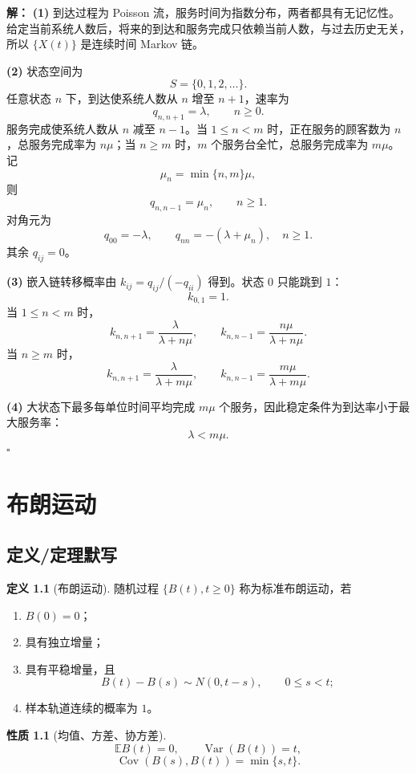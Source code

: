 \documentclass[12pt,a4paper,openany]{ctexrep}
\theoremstyle{definition}
\newtheorem{definition}{定义}[section]
\newtheorem{property}{性质}[section]
\newenvironment{solution}{\par\noindent\textbf{解：}}{\hfill$\square$\par}
\newcommand{\E}{\mathbb{E}}
\newcommand{\Var}{\operatorname{Var}}
\newcommand{\Cov}{\operatorname{Cov}}
\begin{document}
\begin{solution}
\textbf{(1)} 到达过程为 Poisson 流，服务时间为指数分布，两者都具有无记忆性。给定当前系统人数后，将来的到达和服务完成只依赖当前人数，与过去历史无关，所以 $\{X(t)\}$ 是连续时间 Markov 链。

\textbf{(2)} 状态空间为
\[
S=\{0,1,2,\dots\}.
\]
任意状态 $n$ 下，到达使系统人数从 $n$ 增至 $n+1$，速率为
\[
q_{n,n+1}=\lambda,\qquad n\ge0.
\]
服务完成使系统人数从 $n$ 减至 $n-1$。当 $1\le n<m$ 时，正在服务的顾客数为 $n$，总服务完成率为 $n\mu$；当 $n\ge m$ 时，$m$ 个服务台全忙，总服务完成率为 $m\mu$。记
\[
\mu_n=\min\{n,m\}\mu,
\]
则
\[
q_{n,n-1}=\mu_n,\qquad n\ge1.
\]
对角元为
\[
q_{00}=-\lambda,\qquad
q_{nn}=-(\lambda+\mu_n),\quad n\ge1.
\]
其余 $q_{ij}=0$。

\textbf{(3)} 嵌入链转移概率由 $k_{ij}=q_{ij}/(-q_{ii})$ 得到。状态 $0$ 只能跳到 $1$：
\[
k_{0,1}=1.
\]
当 $1\le n<m$ 时，
\[
k_{n,n+1}=\frac{\lambda}{\lambda+n\mu},\qquad
k_{n,n-1}=\frac{n\mu}{\lambda+n\mu}.
\]
当 $n\ge m$ 时，
\[
k_{n,n+1}=\frac{\lambda}{\lambda+m\mu},\qquad
k_{n,n-1}=\frac{m\mu}{\lambda+m\mu}.
\]

\textbf{(4)} 大状态下最多每单位时间平均完成 $m\mu$ 个服务，因此稳定条件为到达率小于最大服务率：
\[
\lambda<m\mu.
\]
\end{solution}

\chapter{布朗运动}

\section{定义/定理默写}

\begin{definition}[布朗运动]
随机过程 $\{B(t),t\ge0\}$ 称为标准布朗运动，若
\begin{enumerate}[label=(\arabic*)]
	\item $B(0)=0$；
	\item 具有独立增量；
	\item 具有平稳增量，且
	\[
	B(t)-B(s)\sim N(0,t-s),\qquad 0\le s<t;
	\]
	\item 样本轨道连续的概率为 $1$。
\end{enumerate}
\end{definition}

\begin{property}[均值、方差、协方差]
\[
\E B(t)=0,\qquad \Var(B(t))=t,
\]
\[
\Cov(B(s),B(t))=\min\{s,t\}.
\]
\end{property}
\end{document}
